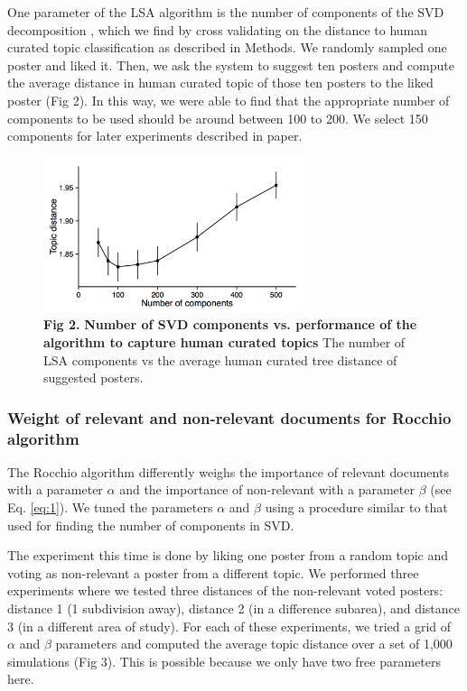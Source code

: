 \documentclass[a4paper]{article}
\begin{document}
One parameter of the LSA algorithm is the number of components of the SVD decomposition \cite{bishop2006pattern}, which we find by cross validating on the distance to human curated topic classification as described in Methods. We randomly sampled one poster and liked it. Then, we ask the system to suggest ten posters and compute the average distance in human curated topic of those ten posters to the liked poster (Fig 2). In this way, we were able to find that the appropriate number of components to be used should be around between 100 to 200. We select 150 components for later experiments described in paper.


\begin{figure}[!ht]
\centering
\includegraphics[width=3in]{performance_vs_components}
\caption*{\textbf{Fig 2.} \textbf{Number of SVD components vs. performance of the algorithm to capture human curated topics}  The number of LSA components vs the average human curated tree distance of suggested posters.}
\end{figure}



\subsubsection*{Weight of relevant and non-relevant documents for Rocchio algorithm}

The Rocchio algorithm differently weighs the importance of relevant documents with a parameter $\alpha$ and the importance of non-relevant with a parameter $\beta$ (see  Eq. \ref{eq:1}). We tuned the parameters $\alpha$ and $\beta$ using a procedure similar to that used for finding the number of components in SVD.

The experiment this time is done by liking one poster from a random topic and voting as non-relevant a poster from a different topic. We performed three experiments where we tested three distances of the non-relevant voted posters: distance 1 (1 subdivision away), distance 2 (in a difference subarea), and distance 3 (in a different area of study). For each of these experiments, we tried a grid of $\alpha$ and $\beta$ parameters and computed the average topic distance over a set of 1,000 simulations (Fig 3). This is possible because we only have two free parameters here.
\end{document}
